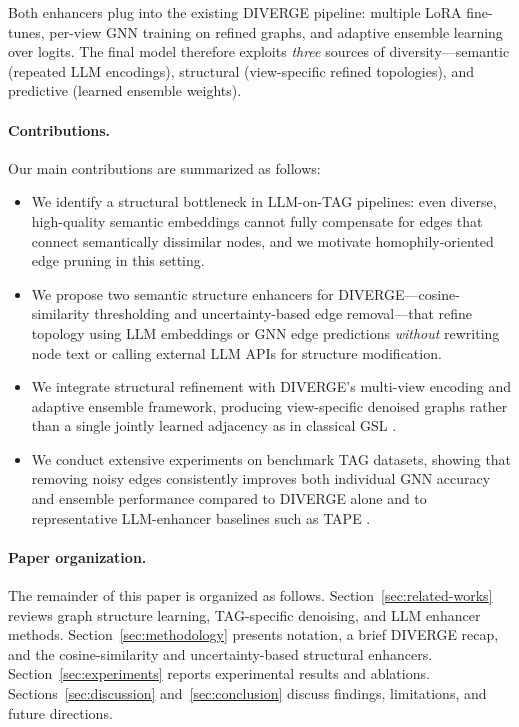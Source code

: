 \documentclass{article}
\begin{document}
Both enhancers plug into the existing DIVERGE pipeline: multiple LoRA fine-tunes,
per-view GNN training on refined graphs, and adaptive ensemble learning over logits.
The final model therefore exploits \emph{three} sources of diversity---semantic
(repeated LLM encodings), structural (view-specific refined topologies), and predictive
(learned ensemble weights).

\paragraph{Contributions.}
Our main contributions are summarized as follows:
\begin{itemize}
\item We identify a structural bottleneck in LLM-on-TAG pipelines: even diverse,
  high-quality semantic embeddings cannot fully compensate for edges that connect
  semantically dissimilar nodes, and we motivate homophily-oriented edge pruning in
  this setting.

\item We propose two semantic structure enhancers for DIVERGE---cosine-similarity
  thresholding and uncertainty-based edge removal---that refine topology using LLM
  embeddings or GNN edge predictions \emph{without} rewriting node text or calling
  external LLM APIs for structure modification.

\item We integrate structural refinement with DIVERGE's multi-view encoding and
  adaptive ensemble framework, producing view-specific denoised graphs rather than a
  single jointly learned adjacency as in classical GSL
  \citep{chen2020idgl,jin2020prognn}.

\item We conduct extensive experiments on benchmark TAG datasets, showing that
  removing noisy edges consistently improves both individual GNN accuracy and ensemble
  performance compared to DIVERGE alone and to representative LLM-enhancer baselines
  such as TAPE \citep{he2024harnessing}.
\end{itemize}

\paragraph{Paper organization.}
The remainder of this paper is organized as follows.
Section~\ref{sec:related-works} reviews graph structure learning, TAG-specific
denoising, and LLM enhancer methods.
Section~\ref{sec:methodology} presents notation, a brief DIVERGE recap, and the
cosine-similarity and uncertainty-based structural enhancers.
Section~\ref{sec:experiments} reports experimental results and ablations.
Sections~\ref{sec:discussion} and~\ref{sec:conclusion} discuss findings, limitations,
and future directions.
\end{document}
